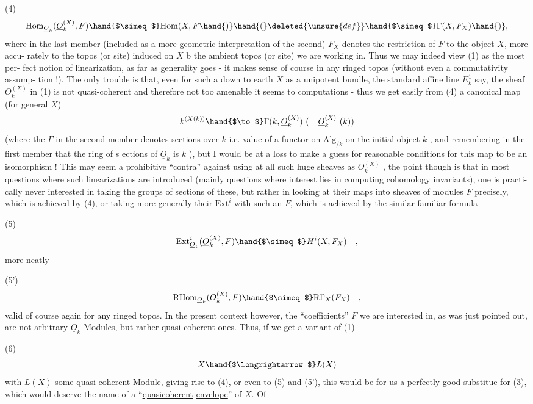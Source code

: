 
(4) \[ \mathrm{Hom}_{\underline{O}_k}( \underline{O}_k^{(X)}, F ) \hand{$\simeq$} \mathrm{Hom}(X,F\hand{)} \hand{(}\deleted{\unsure{def}}\hand{$\simeq$} \Gamma(X,F_X)\hand{)}, \]
where in the last member (included as a more geometric interpretation of
the second) $F_X$ denotes the restriction of $F$ to the object $X$, more accu-%
rately to the topos (or site) induced on $X$ b the ambient topos (or
site) we are working in. Thus we may indeed view (1) as the most per-%
fect notion of linearization, as far as generality goes - it makes
sense of course in any ringed topos (without even a commutativity assump-%
tion !). The only trouble is that, even for such a down to earth $X$ as
a unipotent bundle,  the standard affine line $E_k^1$ say, the sheaf
$\underline{O}_k^{(X)}$ in (1) is not quasi-coherent and therefore not too amenable it
seems to computations - thus we get easily from (4) a canonical map
(for general $X$)
\[ k^{(X(k))} \hand{$\to$} \Gamma(k, \underline{O}_k^{(X)}) \ (= \underline{O}_k^{(X)}\ (k)) \]
(where the $\Gamma$ in the second member denotes sections over $k$ i.e. value of
a functor on $\mathrm{Alg}_{/k}$ on the initial object $k$ , and remembering in the
first member that the ring of s ections of $\underline{O}_k$ is $k$ ), but I would be at
a loss to make a guess  for reasonable conditions for this map to
be an isomorphism ! This may seem a prohibitive ``contra'' against using
at all such huge sheaves as $\underline{O}_k^{(X)}$ , the point though is that in most
questions where such linearizations are introduced (mainly questions
where interest lies in computing cohomology invariants), one is practi-%
cally never interested in taking the groups of sections of these, but
rather in looking at their maps into sheaves of modules $F$ precisely,
which is achieved by (4), or taking more generally their $\mathrm{Ext}^i$ with
such an $F$, which is achieved by the similar familiar formula

(5) \[ \mathrm{Ext}^i_{\underline{O}_k}(\underline{O}_k^{(X)}, F ) \hand{$\simeq$} H^i(X,F_X) \quad , \]
more neatly

(5') \[ \mathrm{RHom}_{\underline{O}_k}( \underline{O}_k^{(X)}, F ) \hand{$\simeq$} \mathrm{R}\Gamma_X(F_X) \quad , \]
valid of course again for any ringed topos. In the present context
however, the ``coefficients'' $F$ we are interested in, as was just pointed
out, are not arbitrary $\underline{O}_k$-Modules, but rather \uline{quasi}-\uline{coherent} ones.
Thus, if we get a variant of (1)

(6) \[ X \hand{$\longrightarrow$} L(X) \]
with $L(X)$ some \uline{quasi}-\uline{coherent} Module, giving rise to (4), or even to
(5) and (5'), this would be for us a perfectly good substitue for (3),
which would deserve the name of a ``\uline{quasicoherent} \uline{envelope}'' of $X$. Of

